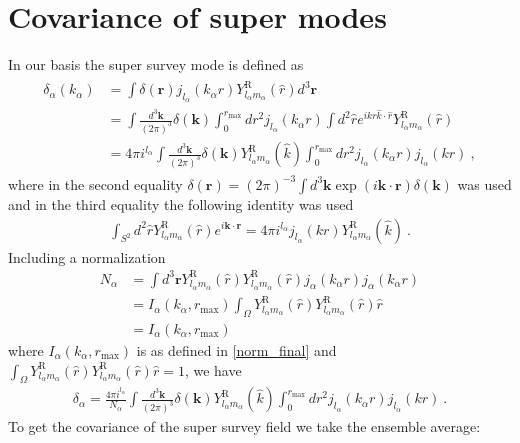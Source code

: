 \documentclass[11pt, oneside]{article}   	%
\newcommand{\sph}[2]{Y^\text{R}_{l_#1 m_#1}(\hat{#2})}
\newcommand{\jl}[1]{j_{l_#1}}
\newcommand{\dk}{\frac{ d^3 \mathbf{k}}{(2 \pi)^3}}
\begin{document}
\section{Covariance of super modes}
In our basis the super survey mode is defined as 
\begin{align} 
\begin{split} 
\delta_\alpha(k_\alpha)& = \int \delta(\mathbf{r}) \jl{\alpha}(k_\alpha r) \sph{\alpha}{r} d^3 \mathbf{r}  \\
& = \int \dk \delta(\mathbf{k}) \int_0^{r_\text{max}} dr^2 \jl{\alpha}(k_\alpha r) \int d^2 \hat{r} e^{ikr \hat{k} \cdot \hat{r}} \sph{\alpha}{r} \\
& =4 \pi i^{l_\alpha}\int  \dk \delta(\mathbf{k})  \sph{\alpha}{k}  \int_0^{r_\text{max}} dr^2 \jl{\alpha}(k_\alpha r) \jl{\alpha}(kr)  ~,
\end{split} 
\end{align} 
where in the second equality $\delta(\mathbf{r})=(2\pi)^{-3} \int d^3 \mathbf{k} \exp(i \mathbf{k} \cdot \mathbf{r}) \delta(\mathbf{k})$ was used and in the third equality the following identity was used 
\begin{align} \int_{S^2} d^2 \hat{r} \sph{\alpha}{r} e^{i \mathbf{k} \cdot \mathbf{r}} = 4 \pi i^{l_\alpha} j_{l_\alpha}(k r)\sph{\alpha}{k}~.
\end{align}
Including a normalization
\begin{align}\label{normalization}
N_\alpha&=\int{d^3\mathbf{r}\sph{\alpha}{r} \sph{\alpha}{r} j_\alpha(k_\alpha r) j_\alpha(k_\alpha r)} \\
&=  I_\alpha(k_\alpha, r_{\text{max}})  \int_\Omega \sph{\alpha}{r} \sph{\alpha}{r} \hat{r}\\
& =I_\alpha(k_\alpha, r_{\text{max}})  
\end{align}
where $ I_\alpha(k_\alpha, r_{\text{max}}) $ is as defined in \eqref{norm_final} and $ \int_\Omega \sph{\alpha}{r} \sph{\alpha}{r} \hat{r}=1$, we have
\begin{align} 
\delta_\alpha= \frac{4 \pi i^{l_\alpha}}{N_\alpha} \int  \dk \delta(\mathbf{k})  \sph{\alpha}{k}  \int_0^{r_\text{max}} dr^2 \jl{\alpha}(k_\alpha r) \jl{\alpha}(kr)  ~.
\end{align} 
To get the covariance of the super survey field we take the ensemble average:
\end{document}
